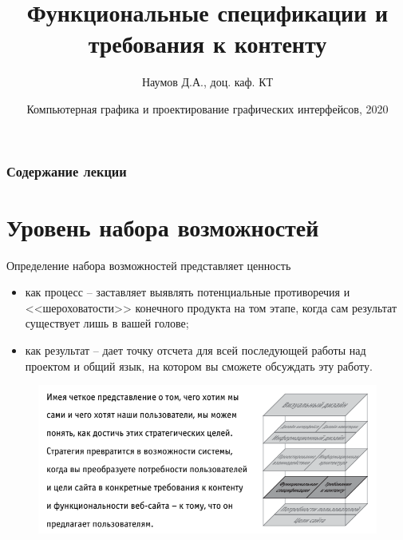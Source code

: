 \documentclass{beamer}
\title[UX Elements]{Функциональные спецификации и требования к контенту}
\author{Наумов Д.А., доц. каф. КТ}
\date[23.09.2020] {Компьютерная графика и проектирование графических интерфейсов, 2020}
\begin{document}
\begin{frame}
  \titlepage
\end{frame}
  
\begin{frame}
  \frametitle{Содержание лекции}
  \tableofcontents  
\end{frame}

\section{Уровень набора возможностей}
  
\begin{frame}[t]
\begin{block}{Определение набора возможностей}
представляет ценность
\begin{itemize}
\item как процесс -- заставляет выявлять потенциальные противоречия и <<шероховатости>> конечного продукта на том этапе, когда сам результат существует лишь в вашей голове;
\item как результат -- дает точку отсчета для всей последующей работы над проектом и общий язык, на котором вы сможете обсуждать эту работу. 
\end{itemize}
\end{block}
\begin{figure}[h]
\centering
\includegraphics[scale=0.4]{images/lec02-pic01.png}
\end{figure}
\end{frame} 
\end{document}
